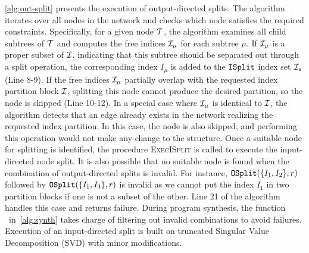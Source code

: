 \cref{alg:out-split} presents the execution of output-directed splits. The algorithm iterates over all nodes in the network and checks which node satisfies the required constraints.
%
Specifically, for a given node $\mathcal{T}$, the algorithm examines all child subtrees of $\mathcal{T}$ and computes the free indices $\mathcal{I}_\mu$ for each subtree $\mu$.
%
If $\mathcal{I}_\mu$ is a proper subset of $\mathcal{I}$, indicating that this subtree should be separated out through a split operation, the corresponding index $I_\mu$ is added to the $\mathtt{ISplit}$ index set $\mathcal{I}_s$ (Line 8-9).
%
If the free indices $\mathcal{I}_\mu$ partially overlap with the requested index partition block $\mathcal{I}$, splitting this node cannot produce the desired partition, so the node is skipped (Line 10-12).
%
In a special case where $\mathcal{I}_\mu$ is identical to $\mathcal{I}$, the algorithm detects that an edge already exists in the network realizing the requested index partition.
%
In this case, the node is also skipped, and performing this operation would not make any change to the structure.
%
Once a suitable node for splitting is identified, the procedure \textsc{ExecISplit} is called to execute the input-directed node split.
%
It is also possible that no suitable node is found when the combination of output-directed splits is invalid.
%
For instance, $\mathtt{OSplit}(\{I_1, I_2\}, r)$ followed by $\mathtt{OSplit}(\{I_1, I_3\}, r)$ is invalid as we cannot put the index $I_1$ in two partition blocks if one is not a subset of the other.
%
Line 21 of the algorithm handles this case and returns failure.
%
During program synthesis, the function \validexpr\ in~\cref{alg:synth} takes charge of filtering out invalid combinations to avoid failures.
%
Execution of an input-directed split is built on truncated Singular Value Decomposition (SVD) with minor modifications.

